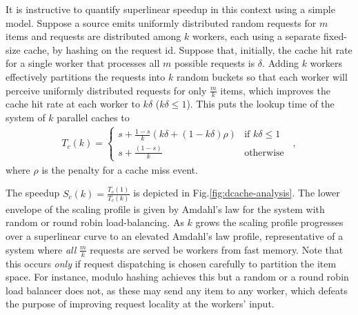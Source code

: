 

It is instructive to quantify superlinear speedup in this context using a simple model. Suppose a source emits uniformly distributed random requests for $m$ items and requests are distributed among $k$ workers, each using a separate fixed-size cache, by hashing on the request id.  Suppose that, initially, the cache hit rate for a single worker that processes all $m$ possible requests is $\delta$. Adding $k$ workers effectively partitions the requests into $k$ random buckets so that each worker will perceive uniformly distributed requests for only $\frac{m}{k}$ items, which improves the cache hit rate at each worker to $k\delta$ ($k\delta \le 1$). This puts the lookup time of the system of $k$ parallel caches to
\begin{align}\label{eq:dist-cache}
  T_c(k) = \begin{cases} s + \frac{1-s}{k}(k\delta + (1-k\delta)\rho) & \text{if } k\delta \le 1\\s + \frac{(1-s)}{k} & \text{otherwise}\end{cases} \enspace ,
\end{align}
where $\rho$ is the penalty for a cache miss event.

The speedup $S_c(k)=\frac{T_c(1)}{T_c(k)}$ is depicted in Fig.\ref{fig:dcache-analysis}. The lower envelope of the scaling profile is given by Amdahl's law for the system with random or round robin load-balancing. %
As $k$ grows the scaling profile progresses over a superlinear curve to an elevated Amdahl's law profile, representative of a system where \emph{all} $\frac{m}{k}$ requests are served be workers from fast memory.  %
Note that this occurs \emph{only} if request dispatching is chosen carefully to partition the item space. For instance, modulo hashing achieves this but a random or a round robin load balancer does not, as these may send any item to any worker, which defeats the purpose of improving request locality at the workers' input. %

